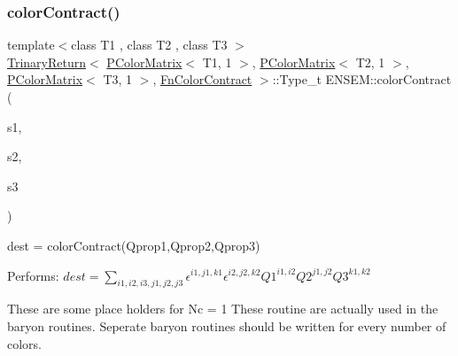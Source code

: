 \subsubsection{\texorpdfstring{colorContract()}{colorContract()}\hspace{0.1cm}{\footnotesize\ttfamily [2/4]}}
{\footnotesize\ttfamily template$<$class T1 , class T2 , class T3 $>$ \\
\mbox{\hyperlink{structENSEM_1_1TrinaryReturn}{Trinary\+Return}}$<$ \mbox{\hyperlink{classENSEM_1_1PColorMatrix}{P\+Color\+Matrix}}$<$ T1, 1 $>$, \mbox{\hyperlink{classENSEM_1_1PColorMatrix}{P\+Color\+Matrix}}$<$ T2, 1 $>$, \mbox{\hyperlink{classENSEM_1_1PColorMatrix}{P\+Color\+Matrix}}$<$ T3, 1 $>$, \mbox{\hyperlink{structENSEM_1_1FnColorContract}{Fn\+Color\+Contract}} $>$\+::Type\+\_\+t E\+N\+S\+E\+M\+::color\+Contract (\begin{DoxyParamCaption}\item[{const \mbox{\hyperlink{classENSEM_1_1PColorMatrix}{P\+Color\+Matrix}}$<$ T1, 1 $>$ \&}]{s1,  }\item[{const \mbox{\hyperlink{classENSEM_1_1PColorMatrix}{P\+Color\+Matrix}}$<$ T2, 1 $>$ \&}]{s2,  }\item[{const \mbox{\hyperlink{classENSEM_1_1PColorMatrix}{P\+Color\+Matrix}}$<$ T3, 1 $>$ \&}]{s3 }\end{DoxyParamCaption})\hspace{0.3cm}{\ttfamily [inline]}}



dest = color\+Contract(\+Qprop1,\+Qprop2,\+Qprop3) 

Performs\+: $dest = \sum_{i1,i2,i3,j1,j2,j3} \epsilon^{i1,j1,k1}\epsilon^{i2,j2,k2} Q1^{i1,i2} Q2^{j1,j2} Q3^{k1,k2}$

These are some place holders for Nc = 1 These routine are actually used in the baryon routines. Seperate baryon routines should be written for every number of colors. \mbox{\label{group__primcolormatrix_gacaff55b3cd1b6aafb43249af3ac16ea9}} 
